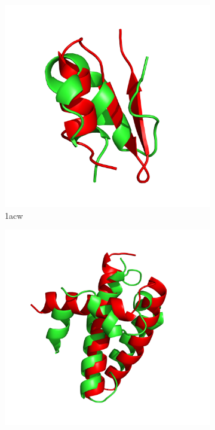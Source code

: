 \begin{figure}
  \begin{subfigure}{0.24\linewidth}
    \centering
    \includegraphics[width=0.9\linewidth]{Figuras/prots/1acw_render.png}
    \caption{1acw}
    \label{fig:1acw-conformation}
  \end{subfigure}
%
  \begin{subfigure}{0.24\linewidth}
    \centering
    \includegraphics[width=0.9\linewidth]{Figuras/prots/1ail_render.png}

\end{subfigure}
\end{figure}

